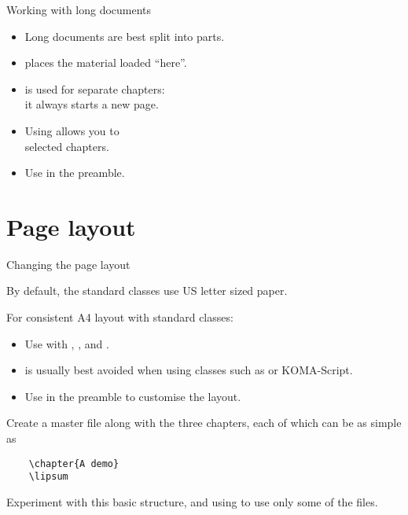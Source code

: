 \begin{frame}{Working with long documents}

  \begin{itemize}
	\item Long documents are best split into parts.
	\item {} places the material loaded \enquote{here}.
	\item {} is used for separate chapters:\\ it always starts a new page.
	\item Using  allows you to \\
	selected chapters.
	\item Use  in the preamble.
  \end{itemize}

\end{frame}

\section{Page layout}

\begin{frame}[fragile]{Changing the page layout}

  By default, the standard classes use US letter sized paper.

  For consistent A4 layout with standard classes:
  \begin{semiverbatim}
    \alert{}
  \end{semiverbatim}

  \begin{itemize}
    \item Use  with , ,  and .
    \item {} is usually best avoided when using classes such as  or KOMA-Script.
    \item Use  in the preamble to customise the layout.
  \end{itemize}

\end{frame}

\begin{exercise}

  Create a master file  along with the three chapters, each of which can be as simple as
  \begin{verbatim}
	\chapter{A demo}
	\lipsum
  \end{verbatim}
  Experiment with this basic structure, and using  to use only some of the files.

\end{exercise}

